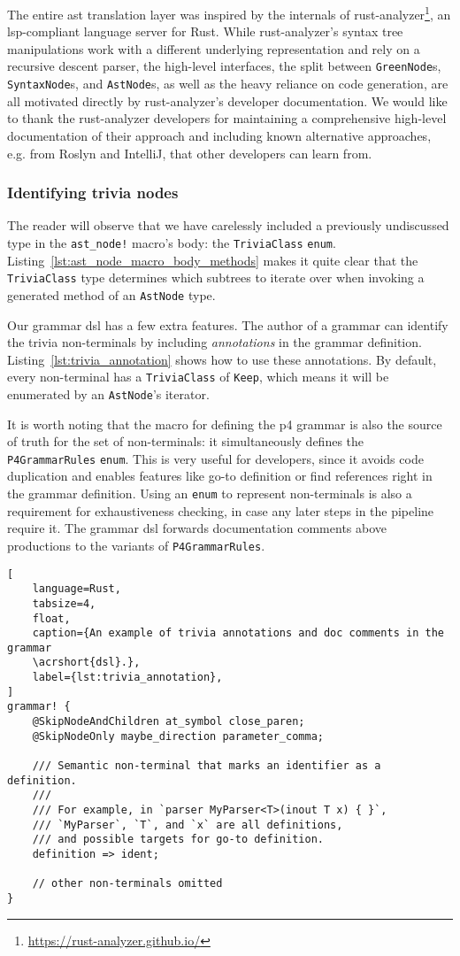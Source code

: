 The entire \acrshort{ast} translation layer was inspired by the internals of
rust-analyzer\footnote{\url{https://rust-analyzer.github.io/}}, an
\acrshort{lsp}-compliant language server for Rust. While rust-analyzer's syntax
tree manipulations work with a different underlying representation and rely on a
recursive descent parser, the high-level interfaces, the split between
\texttt{GreenNode}s, \texttt{SyntaxNode}s, and \texttt{AstNode}s, as well as the
heavy reliance on code generation, are all motivated directly by rust-analyzer's
developer documentation. We would like to thank the rust-analyzer developers for
maintaining a comprehensive high-level documentation of their approach and
including known alternative approaches, e.g. from Roslyn and IntelliJ, that
other developers can learn from.

\subsubsection*{Identifying trivia nodes}

The reader will observe that we have carelessly included a previously
undiscussed type in the \texttt{ast\_node!} macro's body: the
\texttt{TriviaClass} \texttt{enum}.
Listing~\ref{lst:ast_node_macro_body_methods} makes it quite clear that the
\texttt{TriviaClass} type determines which subtrees to iterate over when
invoking a generated method of an \texttt{AstNode} type.

Our grammar \acrshort{dsl} has a few extra features. The author of a grammar can
identify the trivia non-terminals by including \emph{annotations} in the grammar
definition. Listing~\ref{lst:trivia_annotation} shows how to use these
annotations. By default, every non-terminal has a \texttt{TriviaClass} of
\texttt{Keep}, which means it will be enumerated by an \texttt{AstNode}'s
iterator.

It is worth noting that the macro for defining the \acrshort{p4} grammar is also
the source of truth for the set of non-terminals: it simultaneously defines the
\texttt{P4GrammarRules} \texttt{enum}. This is very useful for developers, since
it avoids code duplication and enables features like go-to definition or find
references right in the grammar definition. Using an \texttt{enum} to represent
non-terminals is also a requirement for exhaustiveness checking, in case any
later steps in the pipeline require it. The grammar \acrshort{dsl} forwards
documentation comments above productions to the variants of
\texttt{P4GrammarRules}.

\begin{lstlisting}[
	language=Rust,
	tabsize=4,
	float,
	caption={An example of trivia annotations and doc comments in the grammar
	\acrshort{dsl}.},
	label={lst:trivia_annotation},
]
grammar! {
	@SkipNodeAndChildren at_symbol close_paren;
	@SkipNodeOnly maybe_direction parameter_comma;

	/// Semantic non-terminal that marks an identifier as a definition.
	///
	/// For example, in `parser MyParser<T>(inout T x) { }`,
	/// `MyParser`, `T`, and `x` are all definitions,
	/// and possible targets for go-to definition.
	definition => ident;

	// other non-terminals omitted
}
\end{lstlisting}
